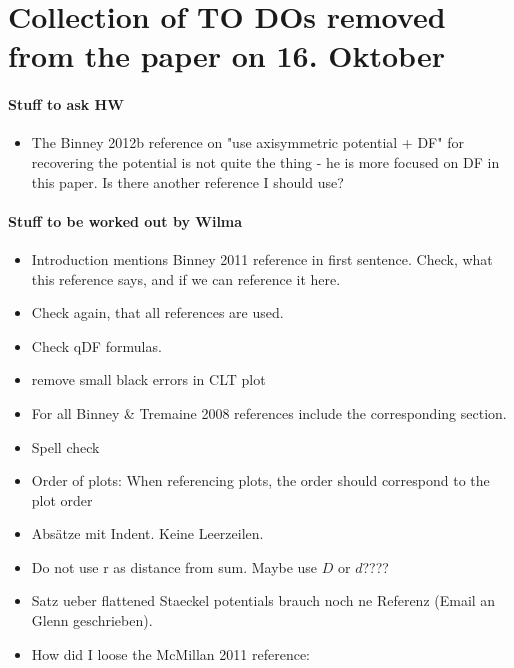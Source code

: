 \section{Collection of TO DOs removed from the paper on 16. Oktober}

\paragraph{Stuff to ask HW}
\begin{itemize}
\item The Binney 2012b reference on "use axisymmetric potential + DF" for recovering the potential is not quite the thing - he is more focused on DF in this paper. Is there another reference I should use?
\end{itemize}

\paragraph{Stuff to be worked out by Wilma}
\begin{itemize}
\item Introduction mentions Binney 2011 reference in first sentence. Check, what this reference says, and if we can reference it here.
\item Check again, that all references are used.
\item Check qDF formulas.
\item remove small black errors in CLT plot
\item For all Binney \& Tremaine 2008 references include the corresponding section.
\item Spell check
\item Order of plots: When referencing plots, the order should correspond to the plot order
\item Absätze mit Indent. Keine Leerzeilen.
\item Do not use r as distance from sum. Maybe use $D$ or $d$????
\item Satz ueber flattened Staeckel potentials brauch noch ne Referenz (Email an Glenn geschrieben).
\item How did I loose the McMillan 2011 reference: %
\end{itemize}

